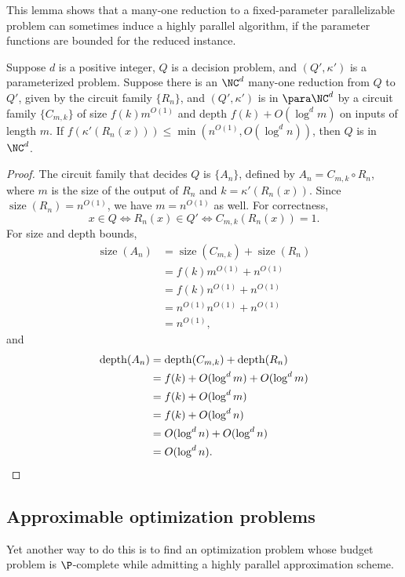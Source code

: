 \documentclass{article}
\DeclareMathOperator{\depth}{depth}
\DeclareMathOperator{\size}{size}
\begin{document}
This lemma shows that a many-one reduction to a fixed-parameter parallelizable problem can sometimes induce a highly parallel algorithm, if the parameter functions are bounded for the reduced instance.

\begin{lemma}\label{lem:reducetonc}
  Suppose $d$ is a positive integer, $Q$ is a decision problem, and $(Q', \kappa')$ is a parameterized problem.
  Suppose there is an $\NC^d$ many-one reduction from $Q$ to $Q'$, given by the circuit family $\{R_n\}$, and $(Q', \kappa')$ is in $\para \NC^d$ by a circuit family $\{C_{m, k}\}$ of size $f(k) m^{O(1)}$ and depth $f(k) + O(\log^d m)$ on inputs of length $m$.
  If $f(\kappa'(R_n(x))) \leq \min(n^{O(1)}, O(\log^d n))$, then $Q$ is in $\NC^d$.
\end{lemma}
\begin{proof}
  The circuit family that decides $Q$ is $\{A_n\}$, defined by $A_n = C_{m, k} \circ R_n$, where $m$ is the size of the output of $R_n$ and $k = \kappa'(R_n(x))$.
  Since $\size(R_n) = n^{O(1)}$, we have $m = n^{O(1)}$ as well.
  For correctness,
  \[
  x \in Q \iff R_n(x) \in Q' \iff C_{m, k}(R_n(x)) = 1.
  \]
  For size and depth bounds,
  \begin{align*}
    \size(A_n) & = \size(C_{m, k}) + \size(R_n) \\
    & = f(k) m^{O(1)} + n^{O(1)} \\
    & = f(k) n^{O(1)} + n^{O(1)} \\
    & = n^{O(1)} n^{O(1)} + n^{O(1)} \\
    & = n^{O(1)},
  \end{align*}
  and
  \begin{align*}
    \depth(A_n) & = \depth(C_{m, k}) + \depth(R_n) \\
    & = f(k) + O(\log^d m) + O(\log^d m) \\
    & = f(k) + O(\log^d m) \\
    & = f(k) + O(\log^d n) \\
    & = O(\log^d n) + O(\log^d n) \\
    & = O(\log^d n). \qedhere
  \end{align*}
\end{proof}

\subsection{Approximable optimization problems}

Yet another way to do this is to find an optimization problem whose budget problem is $\P$-complete while admitting a highly parallel approximation scheme.
\end{document}
